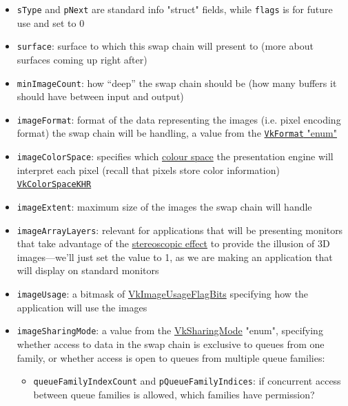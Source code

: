 \documentclass[12pt,letterpaper]{article}
\newcommand{\inquotes}[1]{``#1''}	%
\newcommand{\cil}[1]{\texttt{#1}}
\begin{document}
	\begin{itemize}
		\item \cil{sType} and \cil{pNext} are standard info "struct" fields, while \cil{flags} is for future use and set to 0 
		
		\item \cil{surface}: surface to which this swap chain will present to (more about surfaces coming up right after)
		
		\item \cil{minImageCount}: how \inquotes{deep} the swap chain should be (how many buffers it should have between input and output) 
		
		\item \cil{imageFormat}: format of the data representing the images (i.e. pixel encoding format) the swap chain will be handling, a value from the \href{http://vulkan-spec-chunked.ahcox.com/ch31s03.html#VkFormat}{\cil{VkFormat} "enum"}
        
		\item \cil{imageColorSpace}: specifies which \href{https://en.wikipedia.org/wiki/Color_space}{colour space} the presentation engine will interpret each pixel (recall that pixels store color information) \href{http://vulkan-spec-chunked.ahcox.com/ch29s05.html#VkColorSpaceKHR}{\cil{VkColorSpaceKHR}}
		
		\item \cil{imageExtent}: maximum size of the images the swap chain will handle
		
		\item \cil{imageArrayLayers}: relevant for applications that will be presenting monitors that take advantage of the \href{https://en.wikipedia.org/wiki/Stereo_display}{stereoscopic effect} to provide the illusion of 3D images---we'll just set the value to 1, as we are making an application that will display on standard monitors
		
		\item \cil{imageUsage}: a bitmask of \href{http://vulkan-spec-chunked.ahcox.com/ch11s03.html#VkImageUsageFlagBits}{VkImageUsageFlagBits} specifying how the application will use the images
		
		\item \cil{imageSharingMode}: a value from the \href{https://www.khronos.org/registry/vulkan/specs/1.0/man/html/VkSharingMode.html}{VkSharingMode} "enum", specifying whether access to data in the swap chain is exclusive to queues from one family, or whether access is open to queues from multiple queue families:
			\begin{itemize}
				\item \cil{queueFamilyIndexCount} and \cil{pQueueFamilyIndices}: if concurrent access between queue families is allowed, which families have permission?
			\end{itemize}
		

\end{itemize}
\end{document}
